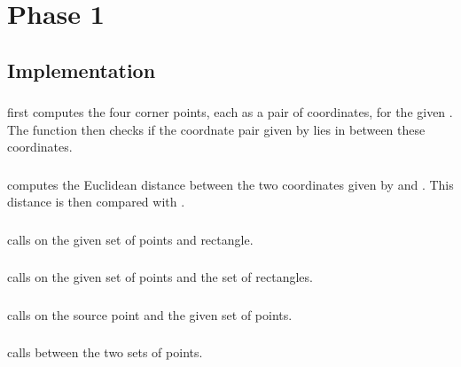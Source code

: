 \newpage

\section{Phase 1} \label{Phase 1}

\subsection{Implementation}

\subsubsection{}
 first computes the four corner points, each as a pair of coordinates, for the given . The function then checks if the coordnate pair given by  lies in between these coordinates.

\subsubsection{}
 computes the Euclidean distance between the two coordinates given by  and . This distance is then compared with .

\subsubsection{}
 calls  on the given set of points and rectangle.

\subsubsection{}
 calls  on the given set of points and the set of rectangles.

\subsubsection{}
 calls  on the source point and the given set of points.

\subsubsection{}
 calls  between the two sets of points.

